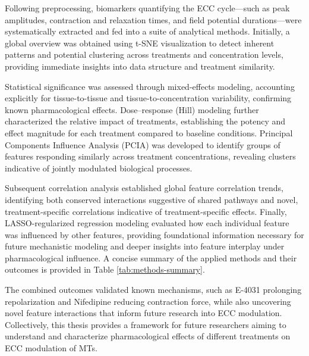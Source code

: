 \documentclass{report}
\begin{document}
    Following preprocessing, biomarkers quantifying the ECC cycle—such as peak amplitudes, contraction and relaxation times, and field potential durations—were systematically extracted and fed into a suite of analytical methods. Initially, a global overview was obtained using t-SNE visualization to detect inherent patterns and potential clustering across treatments and concentration levels, providing immediate insights into data structure and treatment similarity.
    
    Statistical significance was assessed through mixed-effects modeling, accounting explicitly for tissue-to-tissue and tissue-to-concentration variability, confirming known pharmacological effects. Dose–response (Hill) modeling further characterized the relative impact of treatments, establishing the potency and effect magnitude for each treatment compared to baseline conditions. Principal Components Influence Analysis (PCIA) was developed to identify groups of features responding similarly across treatment concentrations, revealing clusters indicative of jointly modulated biological processes. 
    
    Subsequent correlation analysis established global feature correlation trends, identifying both conserved interactions suggestive of shared pathways and novel, treatment-specific correlations indicative of treatment-specific effects. Finally, LASSO-regularized regression modeling evaluated how each individual feature was influenced by other features, providing foundational information necessary for future mechanistic modeling and deeper insights into feature interplay under pharmacological influence. A concise summary of the applied methods and their outcomes is provided in Table \ref{tab:methods-summary}.
    
    The combined outcomes validated known mechanisms, such as E-4031 prolonging repolarization and Nifedipine reducing contraction force, while also uncovering novel feature interactions that inform future research into ECC modulation. Collectively, this thesis provides a framework for future researchers aiming to understand and characterize pharmacological effects of different treatments on ECC modulation of MTs.
\end{document}
